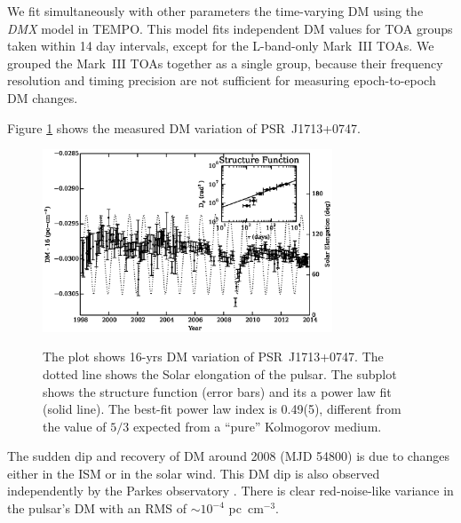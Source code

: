 We fit simultaneously with other parameters the time-varying DM using the {\it
DMX} model in {\sc TEMPO}.
This model fits independent DM values for TOA groups taken within 14 day
intervals, except for the L-band-only Mark~III TOAs. We grouped the Mark~III
TOAs together as a single group, because their frequency resolution and timing
precision are not sufficient for measuring epoch-to-epoch DM changes.

Figure \ref{fig:dmx} shows the measured DM variation of PSR~J1713+0747.
%
\begin{figure}
\includegraphics[width=3.4in]{DMX.ps} \\ 
\caption {\label{fig:dmx} The plot shows 16-yrs DM variation of PSR~J1713+0747. The dotted line shows the Solar
elongation of the pulsar. The subplot shows the structure
function (error bars) and its a power law fit (solid line). The best-fit power law index is
0.49(5), different from the value of $5/3$ expected from a ``pure'' Kolmogorov medium. } 
\end{figure} 
The sudden dip and recovery of DM around 2008 (MJD 54800) is 
due to changes either in the ISM or in the solar wind. This DM dip is also
observed independently by the Parkes observatory \citep{kcs+13}.
There is clear red-noise-like variance in the pulsar's DM with an RMS of
$\sim10^{-4}$ pc~cm$^{-3}$. 



